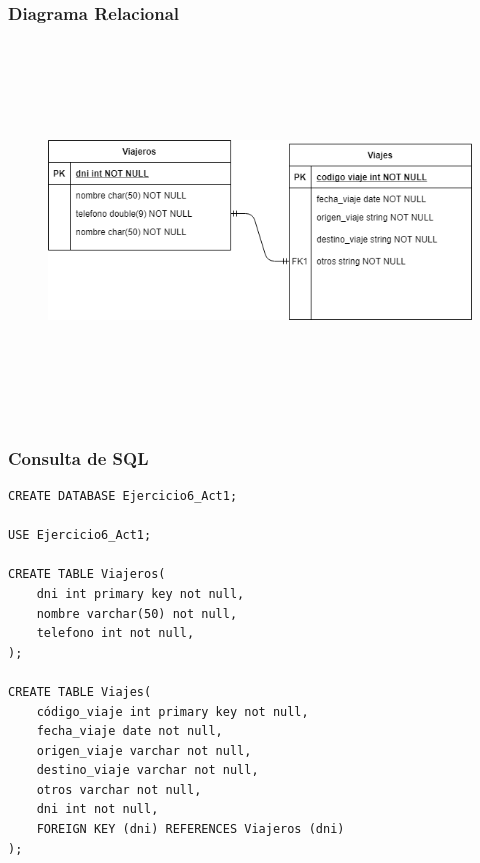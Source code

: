 \documentclass[a4paper, 12pt]{article}
\begin{document}
\begin{justify}
        \subsubsection{Diagrama Relacional}
        \begin{figure}[H]
            \centering
            \includegraphics[width=16cm,height=10cm]{rel6.png}
        \end{figure}
        \subsubsection{Consulta de SQL}
\begin{verbatim}
CREATE DATABASE Ejercicio6_Act1;

USE Ejercicio6_Act1;

CREATE TABLE Viajeros(
    dni int primary key not null,
    nombre varchar(50) not null,
    telefono int not null,
);

CREATE TABLE Viajes(
    código_viaje int primary key not null,
    fecha_viaje date not null,
    origen_viaje varchar not null,
    destino_viaje varchar not null,
    otros varchar not null,
    dni int not null,
    FOREIGN KEY (dni) REFERENCES Viajeros (dni)
);
\end{verbatim}

\end{justify}
\end{document}
